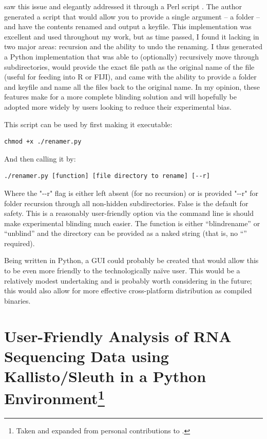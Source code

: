 \citet{Salter2016} saw this issue and elegantly addressed it through a Perl script \citep{Wall2000}. The author generated a script that would allow you to provide a single argument -- a folder -- and have the contents renamed and output a keyfile. This implementation was excellent and used throughout my work, but as time passed, I found it lacking in two major areas: recursion and the ability to undo the renaming. I thus generated a Python implementation that was able to (optionally) recursively move through subdirectories, would provide the exact file path as the original name of the file (useful for feeding into R or FIJI), and came with the ability to provide a folder and keyfile and name all the files back to the original name. In my opinion, these features make for a more complete blinding solution and will hopefully be adopted more widely by users looking to reduce their experimental bias.

This script can be used by first making it executable:

\begin{code}
\begin{verbatim}
chmod +x ./renamer.py
\end{verbatim}
\end{code}

And then calling it by:

\begin{code}
\begin{verbatim}
./renamer.py [function] [file directory to rename] [--r]
\end{verbatim}
\end{code}

Where the "\hyp{}\hyp{}r" flag is either left absent (for no recursion) or is provided "\hyp{}\hyp{}r" for folder recursion through all non\hyp{}hidden subdirectories. False is the default for safety. This is a reasonably user\hyp{}friendly option via the command line is should make experimental blinding much easier. The function is either ``blindrename'' or ``unblind'' and the directory can be provided as a naked string (that is, no ``'' required).

Being written in Python, a GUI could probably be created that would allow this to be even more friendly to the technologically na\"{i}ve user. This would be a relatively modest undertaking and is probably worth considering in the future; this would also allow for more effective cross\hyp{}platform distribution as compiled binaries.

\section[User\hyp{}Friendly Analysis of RNA Sequencing Data using Kallisto/Sleuth in a Python Environment]{User\hyp{}Friendly Analysis of RNA Sequencing Data using Kallisto/Sleuth in a Python Environment\footnote{Taken and expanded from personal contributions to .}}\label{rnaseq}

